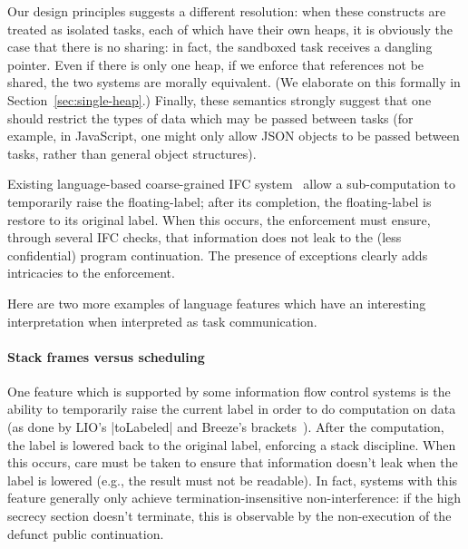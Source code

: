 Our design principles suggests a different resolution: when these
constructs are treated as isolated tasks, each of which have their own heaps, it
is obviously the case that there is no sharing: in fact, the sandboxed task receives a dangling pointer.  Even if there is only one heap, if we enforce that references
not be shared, the two systems are morally equivalent. (We elaborate on
this formally in Section~\ref{sec:single-heap}.)  Finally, these
semantics strongly suggest that one should restrict the types of
data which may be passed between tasks (for example, in JavaScript, one
might only allow JSON objects to be passed between tasks, rather than
general object structures).

Existing language-based coarse-grained IFC
system~\cite{Hritcu:2013:YIB:2497621.2498098,stefan:2012:arxiv-flexible} allow
a sub-computation to temporarily raise the floating-label; after its
completion, the floating-label is restore to its original label. When this
occurs, the enforcement must ensure, through several IFC checks, that information
does not leak to the (less confidential) program continuation. The presence of
exceptions clearly adds intricacies to the enforcement.




Here are two more examples of language features which have an
interesting interpretation when interpreted as task communication.

\paragraph{Stack frames versus scheduling}  One feature which is
supported by some information flow control systems is the ability to
temporarily raise the current label in order to do computation on data
(as done by LIO's |toLabeled| and Breeze's
brackets~\cite{Hritcu:2013:YIB:2497621.2498098,
stefan:2012:arxiv-flexible}).  After the computation, the label is lowered back to the original label,
enforcing a stack discipline.  When this occurs, care must be taken to ensure that information doesn't leak when
the label is lowered (e.g., the result must not be readable). In fact, systems with this feature generally only
achieve termination-insensitive non-interference: if the high secrecy
section doesn't terminate, this is observable by the non-execution of
the defunct public continuation.

